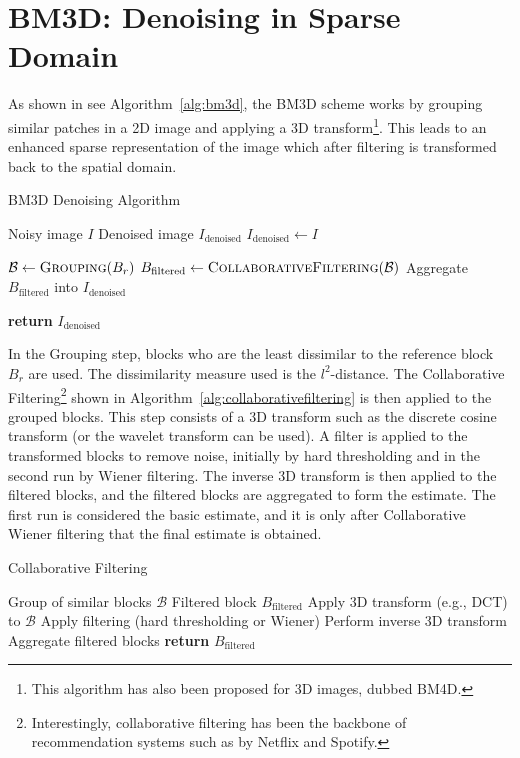 \section{BM3D: Denoising in Sparse Domain}
As shown in see Algorithm~\ref{alg:bm3d}, the \gls{BM3D} scheme works by grouping similar patches in a 2D image and applying a 3D transform\footnote{This algorithm has also been proposed for 3D images, dubbed BM4D.}. This leads to an enhanced sparse representation of the image which after filtering is transformed back to the spatial domain.
\begin{algorithm}
    \caption{BM3D Denoising Algorithm}\label{alg:bm3d}
    \begin{algorithmic}[1]
    \Require Noisy image $I$
    \Ensure Denoised image $I_{\text{denoised}}$
    \Statex
        \State $I_{\text{denoised}} \gets I$
        
            \State $\mathcal{B} \gets \textsc{Grouping}(B_r)$
            \State $B_{\text{filtered}} \gets \textsc{CollaborativeFiltering}(\mathcal{B})$
            \State Aggregate $B_{\text{filtered}}$ into $I_{\text{denoised}}$
        \EndFor
        
        \State \textbf{return} $I_{\text{denoised}}$
    \EndProcedure
    \end{algorithmic}
\end{algorithm}

In the Grouping step, blocks who are the least dissimilar to the reference block $B_r$ are used. The dissimilarity measure used is the $l^2$-distance. The Collaborative Filtering\footnote{Interestingly, collaborative filtering has been the backbone of recommendation systems such as by Netflix and Spotify.} shown in Algorithm~\ref{alg:collaborativefiltering} is then applied to the grouped blocks. This step consists of a 3D transform such as the discrete cosine transform (or the wavelet transform can be used). A filter is applied to the transformed blocks to remove noise, initially by hard thresholding and in the second run by Wiener filtering. The inverse 3D transform is then applied to the filtered blocks, and the filtered blocks are aggregated to form the estimate. The first run is considered the basic estimate, and it is only after Collaborative Wiener filtering that the final estimate is obtained.
    
\begin{algorithm}
    \caption{Collaborative Filtering}\label{alg:collaborativefiltering}
    \begin{algorithmic}[1]
    \Require Group of similar blocks $\mathcal{B}$
    \Ensure Filtered block $B_{\text{filtered}}$
        \State Apply 3D transform (e.g., DCT) to $\mathcal{B}$
        \State Apply filtering (hard thresholding or Wiener)
        \State Perform inverse 3D transform
        \State Aggregate filtered blocks
        \State \textbf{return} $B_{\text{filtered}}$
    \EndProcedure
    \end{algorithmic}
\end{algorithm}

